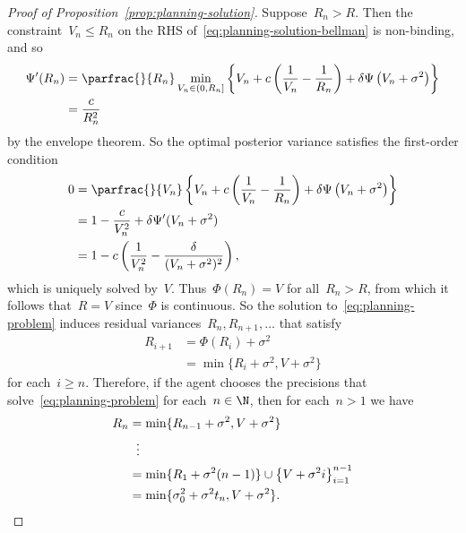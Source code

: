 \begin{proof}[Proof of Proposition~\ref{prop:planning-solution}]
    Suppose~$R_n>R$.
    Then the constraint~$V_n\le R_n$ on the RHS of~\eqref{eq:planning-solution-bellman} is non-binding, and so
    \begin{align*}
        \Psi'(R_n)
        &= \parfrac{}{R_n}\min_{V_n\in(0,R_n]}\left\{V_n+c\left(\frac{1}{V_n}-\frac{1}{R_n}\right)+\delta\Psi\left(V_n+\sigma^2\right)\right\} \\
        &= \frac{c}{R_n^2}
    \end{align*}
    by the envelope theorem.
    So the optimal posterior variance satisfies the first-order condition
    \begin{align*}
        0
        &= \parfrac{}{V_n}\left\{V_n+c\left(\frac{1}{V_n}-\frac{1}{R_n}\right)+\delta\Psi\left(V_n+\sigma^2\right)\right\} \\
        &= 1-\frac{c}{V_n^2}+\delta\Psi'(V_n+\sigma^2) \\
        &= 1-c\left(\frac{1}{V_n^2}-\frac{\delta}{(V_n+\sigma^2)^2}\right),
    \end{align*}
    which is uniquely solved by~$V$.
    Thus~$\Phi(R_n)=V$ for all~$R_n>R$, from which it follows that~$R=V$ since~$\Phi$ is continuous.
    So the solution to~\eqref{eq:planning-problem} induces residual variances~$R_n,R_{n+1},\ldots$ that satisfy
    \begin{align*}
        R_{i+1}
        &= \Phi(R_i)+\sigma^2 \\
        &= \min\{R_i+\sigma^2,V+\sigma^2\}
    \end{align*}
    for each~$i\ge n$.
    Therefore, if the agent chooses the precisions that solve~\eqref{eq:planning-problem} for each~$n\in\N$, then for each~$n>1$ we have
    \begin{align*}
        R_n
        &= \min\{R_{n-1}+\sigma^2,V+\sigma^2\} \\ 
        &\hspace{0.6em} \vdots \\
        &= \min\{R_1+\sigma^2(n-1)\}\cup\left\{V+\sigma^2i\right\}_{i=1}^{n-1} \\
        &= \min\{\sigma_0^2+\sigma^2t_n,V+\sigma^2\}.
    \end{align*}

\end{proof}

